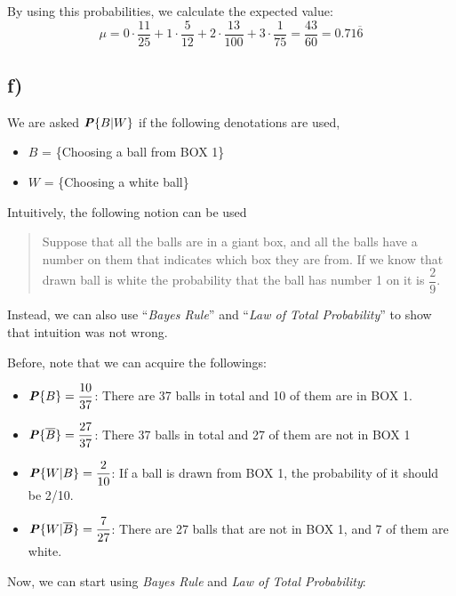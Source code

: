 \documentclass[12pt]{article}
\newcommand{\prob}[1]{\textbf{\textit{P}}\{#1\}}
\begin{document}
\noindent By using this probabilities, we calculate the expected value:
\begin{equation*}
    \mu = 0 \cdot \dfrac{11}{25} + 1 \cdot \dfrac{5}{12} + 2 \cdot \dfrac{13}{100} + 3 \cdot \dfrac{1}{75} = \dfrac{43}{60} = 0.71\overline{6}
\end{equation*}

\newpage

\subsection*{f)}

We are asked $\prob{B | W}$ if the following denotations are used,

\begin{itemize}
    \item $B$ = \{Choosing a ball from BOX 1\}
    \item $W$ = \{Choosing a white ball\}
\end{itemize}

\noindent Intuitively, the following notion can be used
\begin{quote}
    Suppose that all the balls are in a giant box, and all the balls have a number on them that indicates which box they are from. If we know that drawn ball is white the probability that the ball has number 1 on it is $\dfrac{2}{9}$.    
\end{quote}

Instead, we can also use ``\textit{Bayes Rule}'' and ``\textit{Law of Total Probability}'' to show that intuition was not wrong.

\noindent Before, note that we can acquire the followings:
\begin{itemize}
    \item $\prob{B} = \dfrac{10}{37}$: There are 37 balls in total and 10 of them are in BOX 1.
    \item $\prob{\overline{B}} = \dfrac{27}{37}$: There 37 balls in total and 27 of them are not in BOX 1
    \item $\prob{W | B} = \dfrac{2}{10}$: If a ball is drawn from BOX 1, the probability of it should be 2/10.
    \item $\prob{W |\overline{B}} = \dfrac{7}{27}$: There are 27 balls that are not in BOX 1, and 7 of them are white.
\end{itemize}

\noindent Now, we can start using \textit{Bayes Rule} and \textit{Law of Total Probability}:
\end{document}
